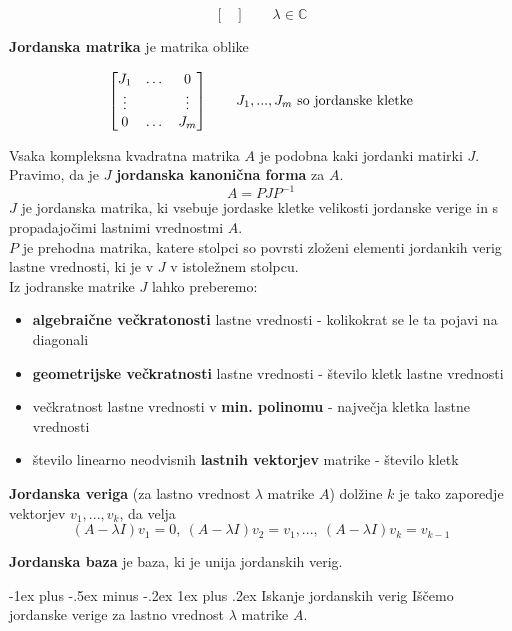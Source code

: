 \documentclass[a4paper,landscape]{article}
\makeatletter
\renewcommand{\subsubsection}{\@startsection{subsubsection}{3}{0mm}%
                                {-1ex plus -.5ex minus -.2ex}%
                                {1ex plus .2ex}%
                                {\normalfont\small\bfseries}}
\makeatother
\begin{document}
\begin{multicols}{3}
\[\begin{bmatrix}
    \end{bmatrix}
    \qquad
    \lambda \in \mathbb{C}
\]

\textbf{Jordanska matrika} je matrika oblike

\[
    \begin{bmatrix}
        J_1 & \dots & 0 \\
        \vdots & & \vdots \\
        0 & \dots & J_m \\
    \end{bmatrix}    
    \qquad
    J_1, ..., J_m \textmd{ so jordanske kletke}
\]

Vsaka kompleksna kvadratna matrika $A$ je podobna kaki jordanki matirki $J$. Pravimo, da je $J$ \textbf{jordanska kanonična forma} za $A$.
\[A = PJP^{-1}\]
$J$ je jordanska matrika, ki vsebuje jordaske kletke velikosti jordanske verige in s propadajočimi lastnimi vrednostmi $A$. \\
$P$ je prehodna matrika, katere stolpci so povrsti zloženi elementi jordankih verig lastne vrednosti, ki je v $J$ v istoležnem stolpcu.\\

Iz jodranske matrike $J$ lahko preberemo:
\begin{itemize}
    \item \textbf{algebraične večkratonosti} lastne vrednosti - kolikokrat se le ta pojavi na diagonali
    \item \textbf{geometrijske večkratnosti} lastne vrednosti - število kletk lastne vrednosti
    \item večkratnost lastne vrednosti v \textbf{min. polinomu} - največja kletka lastne vrednosti
    \item število linearno neodvisnih \textbf{lastnih vektorjev} matrike - število kletk
\end{itemize}

\textbf{Jordanska veriga} (za lastno vrednost $\lambda$ matrike $A$) dolžine $k$ je tako zaporedje vektorjev $v_1, ..., v_k$, da velja
\[ (A-\lambda I)v_1 = 0,\ (A-\lambda I)v_2 = v_1, ... ,\ (A-\lambda I)v_k = v_{k-1}\]

\textbf{Jordanska baza} je baza, ki je unija jordanskih verig.

\subsubsection{Iskanje jordanskih verig}
Iščemo jordanske verige za lastno vrednost $\lambda$ matrike $A$.


\end{multicols}
\end{document}
